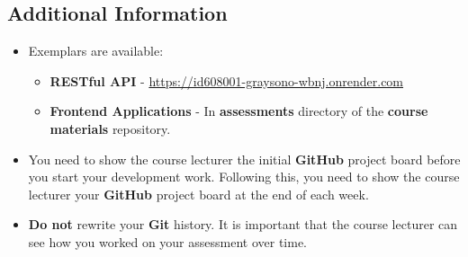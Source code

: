 \documentclass{article}
\begin{document}
\subsection*{Additional Information}
\begin{itemize}
	\item Exemplars are available:
	\begin{itemize}
		\item \textbf{RESTful API} - \href{https://id608001-graysono-wbnj.onrender.com}{https://id608001-graysono-wbnj.onrender.com}
		\item \textbf{Frontend Applications} - In \textbf{assessments} directory of the \textbf{course materials} repository.
	\end{itemize}
    \item You need to show the course lecturer the initial \textbf{GitHub} project board before you start your development work. Following this, you need to show the course lecturer your \textbf{GitHub} project board at the end of each week.
    \item \textbf{Do not} rewrite your \textbf{Git} history. It is important that the course lecturer can see how you worked on your assessment over time. 
\end{itemize} 
\end{document}
